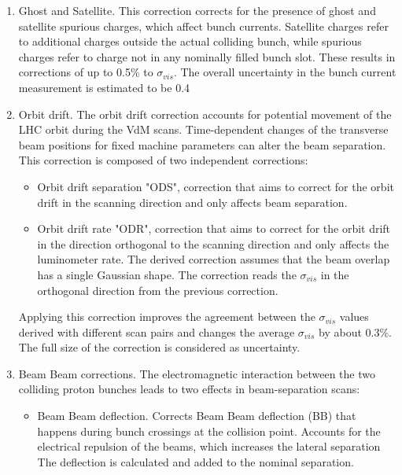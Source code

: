 \begin{enumerate}

\item Ghost and Satellite. This correction corrects for the presence of ghost and satellite spurious charges, which affect bunch currents. Satellite charges refer to additional charges outside the actual colliding bunch, while spurious charges refer to charge not in any nominally filled bunch slot. These results in corrections of up to 0.5\% to $\sigma_{vis}$. The overall uncertainty in the bunch current measurement is estimated to be 0.4%

\item Orbit drift. The orbit drift correction accounts for potential movement of the LHC orbit during the VdM scans. Time-dependent changes of the transverse beam positions for fixed machine parameters can alter the beam separation. This correction is composed of two independent corrections: 

\begin{itemize}

\item Orbit drift separation "ODS", correction that aims to correct for the orbit drift in the scanning direction and only affects beam separation. 

\item  Orbit drift rate "ODR", correction that aims to correct for the orbit drift in the direction orthogonal to the scanning direction and only affects the luminometer rate. The derived correction assumes that the beam overlap has a single Gaussian shape. The correction reads the $\sigma_{vis}$ in the orthogonal direction from the previous correction. 
\end{itemize}

Applying this correction improves the agreement between the $\sigma_{vis}$ values derived with different scan pairs and changes the average $\sigma_{vis}$ by about 0.3\%. The full size of the correction is considered as uncertainty.

\item Beam Beam corrections.  The electromagnetic interaction between the two colliding proton bunches leads to two effects in beam-separation scans:

\begin{itemize}

\item Beam Beam deflection. Corrects Beam Beam deflection (BB) that happens during bunch crossings at the collision point. Accounts for the electrical repulsion of the beams, which increases the lateral separation  The deflection is calculated and added to the nominal separation.


\end{itemize}
\end{enumerate}
